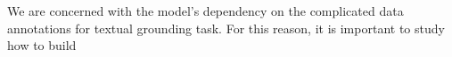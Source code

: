 



We are concerned with the model's dependency on the complicated data annotations for textual grounding task. For this reason, it is important to study how to build 

